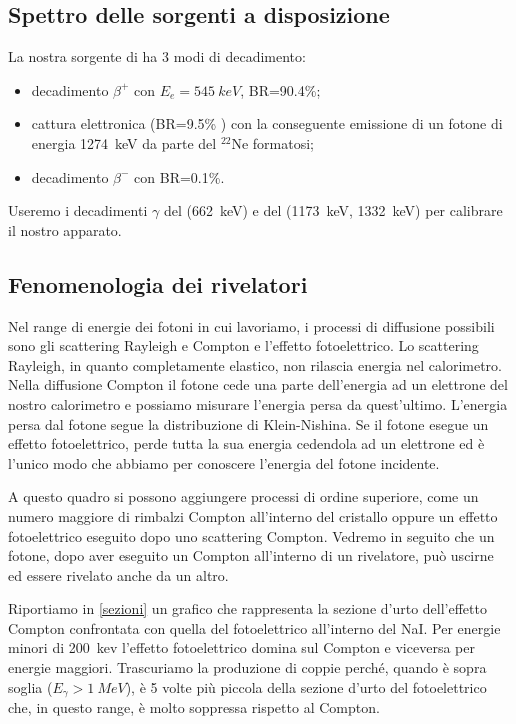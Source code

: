 \subsection{Spettro delle sorgenti a disposizione}

La nostra sorgente di \na{} ha 3 modi di decadimento:
\begin{itemize}
\item decadimento $\beta^+$ con $E_e=\SI{545}{keV}$, BR=90.4\%;
\item cattura elettronica (BR=9.5\% ) con la conseguente emissione di un fotone di energia \SI{1274}{keV} da parte del $^{22}$Ne formatosi;
\item decadimento $\beta^-$ con BR=0.1\%.
\end{itemize}

Useremo i decadimenti $\gamma$ del \cs{} (\SI{662}{keV}) e del \co{} (\SI{1173}{keV}, \SI{1332}{keV}) per calibrare il nostro apparato.


\subsection{Fenomenologia dei rivelatori}


Nel range di energie dei fotoni in cui lavoriamo, i processi di diffusione possibili sono gli scattering Rayleigh e Compton e l'effetto fotoelettrico.
Lo scattering Rayleigh, in quanto completamente elastico, non rilascia energia nel calorimetro.
Nella diffusione Compton il fotone cede una parte dell'energia ad un elettrone del nostro calorimetro e possiamo misurare l'energia persa da quest'ultimo. L'energia persa dal fotone segue la distribuzione di Klein-Nishina.
Se il fotone esegue un effetto fotoelettrico, perde tutta la sua energia cedendola ad un elettrone ed è l'unico modo che abbiamo per conoscere l'energia del fotone incidente.

A questo quadro si possono aggiungere processi di ordine superiore, come un numero maggiore di rimbalzi Compton all'interno del cristallo oppure un effetto fotoelettrico eseguito dopo uno scattering Compton.
Vedremo in seguito che un fotone, dopo aver eseguito un Compton all'interno di un rivelatore, può uscirne ed essere rivelato anche da un altro.

Riportiamo in \autoref{sezioni} un grafico che rappresenta la sezione d'urto dell'effetto Compton confrontata con quella del fotoelettrico all'interno del NaI. Per energie minori di \SI{200}{kev} l'effetto fotoelettrico domina sul Compton e viceversa per energie maggiori.
Trascuriamo la produzione di coppie perché, quando è sopra soglia ($E_{\gamma}>\SI{1}{MeV}$), è 5 volte più piccola della sezione d'urto del fotoelettrico che, in questo range, è molto soppressa rispetto al Compton.

